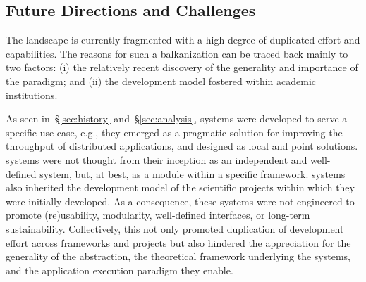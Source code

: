 \documentclass{sig-alternate}
\begin{document}




%
\subsection{Future Directions and Challenges}
\label{sec:future}

The \pilot landscape is currently fragmented with a high degree of duplicated
effort and capabilities. The reasons for such a balkanization can be traced back
mainly to two factors: (i) the relatively recent discovery of the generality and
importance of the \pilot paradigm; and (ii) the development model fostered
within academic institutions.

As seen in~\S\ref{sec:history} and~\S\ref{sec:analysis}, \pilot systems were
developed to serve a specific use case, e.g., they emerged as a pragmatic
solution for improving the throughput of distributed applications, and designed
as local and point solutions. \pilot systems were not thought from their
inception as an independent and well-defined system, but, at best, as a module
within a specific framework. \pilot systems also inherited the development model
of the scientific projects within which they were initially developed. As a
consequence, these systems were not engineered to promote (re)usability,
modularity, well-defined interfaces, or long-term sustainability. Collectively,
this not only promoted duplication of development effort across frameworks and
projects but also hindered the appreciation for the generality of the \pilot
abstraction, the theoretical framework underlying the \pilot systems, and the
application execution paradigm they enable.
\end{document}
